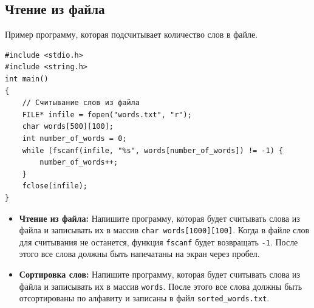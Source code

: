 \documentclass{article}
\begin{document}
\subsection*{Чтение из файла}
Пример программу, которая подсчитывает количество слов в файле.
\begin{lstlisting}
#include <stdio.h>
#include <string.h>
int main() 
{
	// Считывание слов из файла
	FILE* infile = fopen("words.txt", "r");
	char words[500][100];
	int number_of_words = 0;
	while (fscanf(infile, "%s", words[number_of_words]) != -1) {
		number_of_words++;
	}
	fclose(infile);
}
\end{lstlisting}
\begin{itemize}
\item \textbf{Чтение из файла:} Напишите программу, которая будет считывать слова из файла и записывать их в массив \texttt{char words[1000][100]}. Когда в файле слов для считывания не останется, функция \texttt{fscanf} будет возвращать \texttt{-1}. После этого все слова должны быть напечатаны на экран через пробел. 
\item \textbf{Сортировка слов:} Напишите программу, которая будет считывать слова из файла и записывать их в массив \texttt{words}. После этого все слова должны быть отсортированы по алфавиту и записаны в файл \texttt{sorted\_words.txt}.
\end{itemize}
\end{document}
